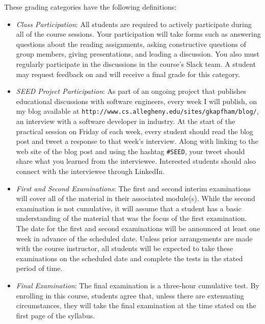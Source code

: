 \documentclass[11pt]{article}
\newcommand{\url}[1]{\lstinline{#1}}
\begin{document}
\vspace*{-.1in}
\noindent
These grading categories have the following definitions:
\vspace*{-.1in}

\begin{itemize}

  \item {\em Class Participation\/}: All students are required to actively participate during all of the course
    sessions. Your participation will take forms such as answering questions about the reading assignments, asking
    constructive questions of group members, giving presentations, and leading a discussion. You also must regularly
    participate in the discussions in the course's Slack team. A student may request feedback on and will receive a
    final grade for this category.

  \item {\em SEED Project Participation\/}: As part of an ongoing project that publishes educational discussions with
    software engineers, every week I will publish, on my blog available at
    \url{http://www.cs.allegheny.edu/sites/gkapfham/blog/}, an interview with a software developer in industry. At the
    start of the practical session on Friday of each week, every student should read the blog post and tweet a response
    to that week's interview. Along with linking to the web site of the blog post and using the hashtag \url{#SEED},
    your tweet should share what you learned from the interviewee. Interested students should also connect with the
    interviewee through LinkedIn.

  \item {\em First and Second Examinations\/}: The first and second interim examinations will cover all of the material
    in their associated module(s). While the second examination is not cumulative, it will assume that a student has a
    basic understanding of the material that was the focus of the first examination. The date for the first and second
    examinations will be announced at least one week in advance of the scheduled date. Unless prior arrangements are
    made with the course instructor, all students will be expected to take these examinations on the scheduled date and
    complete the tests in the stated period of time.

  \item {\em Final Examination\/}: The final examination is a three-hour cumulative test. By enrolling in this course,
    students agree that, unless there are extenuating circumstances, they will take the final examination at the time
    stated on the first page of the syllabus.


\end{itemize}
\end{document}
